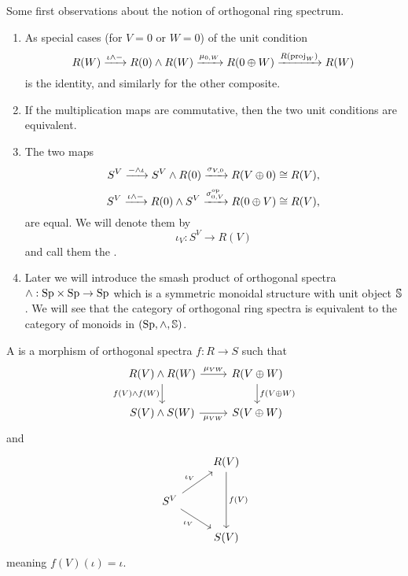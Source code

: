 \begin{remark}
Some first observations about the notion of orthogonal ring spectrum.

\begin{enumerate}
\item As special cases (for $V=0$ or $W=0$) of the unit condition
\[R(W)\xrightarrow{\iota\wedge-}R(0)\wedge R(W)\xrightarrow{\mu_{0,W}}R(0\oplus W)\xrightarrow{R(\operatorname{proj}_W)}R(W)\]
is the identity, and similarly for the other composite.

\item If the multiplication maps are commutative, then the two unit conditions are equivalent.

\item The two maps
\[S^V\xrightarrow{-\wedge\iota}S^V\wedge R(0)\xrightarrow{\sigma_{V,0}}R(V\oplus0)\cong R(V),\]
\[S^V\xrightarrow{\iota\wedge-}R(0)\wedge S^V\xrightarrow{\sigma^{\operatorname{op}}_{0,V}}R(0\oplus V)\cong R(V),\]
are equal. We will denote them by
\[\iota_V:S^V\to R(V)\]
and call them the .

\item Later we will introduce the smash product of orthogonal spectra $\wedge:{\normalfont\textup{Sp}}\times{\normalfont\textup{Sp}}\to{\normalfont\textup{Sp}}$ which is a symmetric monoidal structure with unit object $\mathbb{S}$. We will see that the category of orthogonal ring spectra is equivalent to the category of monoids in $({\normalfont\textup{Sp}},\wedge,\mathbb{S})$.
\end{enumerate}
\end{remark}

\begin{definition}
A  is a morphism of orthogonal spectra $f:R\to S$ such that
\[
\begin{tikzcd}
R(V) \smsh R(W) \arrow[r, "\mu_{VW}"] \arrow[d, "f(V) \smsh f(W)", swap] & R(V \oplus W) \arrow[d, "f(V \oplus W)"]\\
S(V) \smsh S(W) \arrow[r, "\mu_{VW}", swap] & S(V \oplus W)
\end{tikzcd}
\]
and
\[
\begin{tikzcd}
& R(V) \arrow[dd, "f(V)"]\\
S^V \arrow[ur, "\iota_V"] \arrow[dr, "\iota_V", swap]\\
& S(V)
\end{tikzcd}
\]
meaning $f(V)(\iota) = \iota$.
\end{definition}

